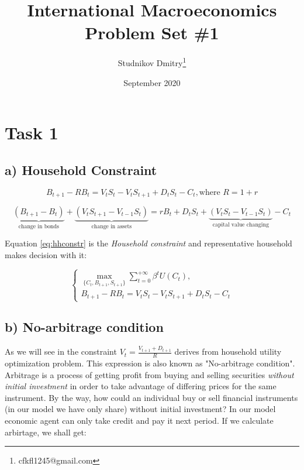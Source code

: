 \documentclass{article}
\title{International Macroeconomics \\ Problem Set \#1}
\author{Studnikov Dmitry\thanks{cfkfl1245@gmail.com}}
\date{September 2020}
\begin{document}
\maketitle

\section*{Task 1} \label{sec:sec1}

\subsection*{a) Household Constraint}

\begin{equation}
    B_{t+1} - RB_{t} = V_{t}S_{t} - V_{t}S_{t+1} +D_{t}S_{t} - C_{t}, \text{where } R = 1+r
\end{equation}

\begin{equation}
    \underbrace{(B_{t+1} - B_t)}_\text{change in bonds} + \underbrace{(V_{t}S_{t+1} - V_{t-1}S_{t})}_\text{change in assets} = rB_t + D_{t}S_{t} + \underbrace{(V_{t}S_{t} - V_{t-1}S_{t})}_\text{capital value changing} - C_t
    \label{eq:hhconstr}
\end{equation}

Equation \ref{eq:hhconstr} is the \textit{Household constraint} and representative household makes decision with it:

\begin{equation}
    \begin{cases}
        \max\limits_{\{C_{t}, B_{t+1}, S_{t+1}\}} \sum_{t = 0} ^ {+\infty}\beta^{t}U(C_t), \\
        B_{t+1} - RB_{t} = V_{t}S_{t} - V_{t}S_{t+1} +D_{t}S_{t} - C_{t}
    \end{cases}
\end{equation}

\subsection*{b) No-arbitrage condition}
As we will see in  the constraint $V_t = \frac{V_{t+1}+D_{t+1}}{R}$ derives from household utility optimization problem. This expression is also known as "No-arbitrage condition". Arbitrage is a process of getting profit from buying and selling securities \textit{without initial investment} in order to take advantage of differing prices for the same instrument. By the way, how could an individual buy or sell financial instruments (in our model we have only share) without initial investment? In our model economic agent can only take credit and pay it next period. If we calculate arbirtage, we shall get:
\end{document}

